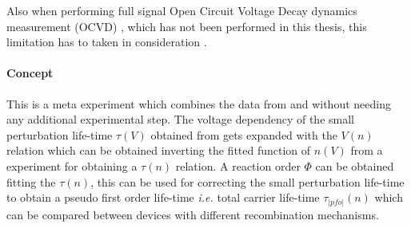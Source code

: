 Also when performing full signal Open Circuit Voltage Decay dynamics measurement (OCVD) \cite{Lederhandler1955,Mahan1981}, which has not been performed in this thesis, this limitation has to taken in consideration \cite{Tvingstedt2017,Pockett2017.Pockett2015,Kiermasch2018}.

\label{tpvce}

\paragraph{Concept}
This is a meta experiment which combines the data from  and  without needing any additional experimental step.
The voltage dependency of the small perturbation life-time $\tau(V)$ obtained from  gets expanded with the $V(n)$ relation which can be obtained inverting the fitted function of $n(V)$ from a  experiment for obtaining a $\tau(n)$ relation.
A reaction order $\Phi$ can be obtained fitting the $\tau(n)$, this can be used for correcting the small perturbation life-time to obtain a pseudo first order life-time \textit{i.e.} total carrier life-time $\tau_|pfo|(n)$ which can be compared between devices with different recombination mechanisms.

